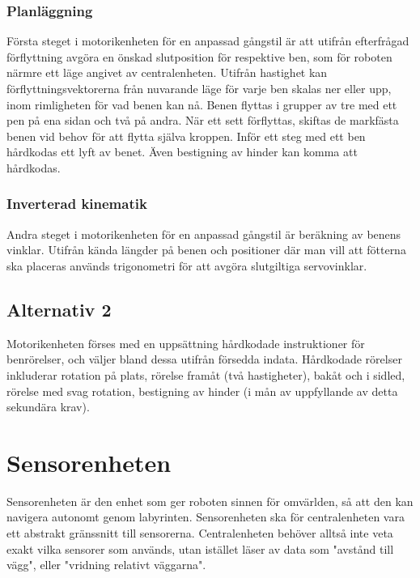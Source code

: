 \documentclass[a4paper,titlepage,12pt]{article}
\begin{document}
		\subsubsection{Planläggning}
	Första steget i motorikenheten för en anpassad gångstil är att utifrån efterfrågad
	förflyttning avgöra en önskad slutposition för respektive ben, som för roboten närmre 
	ett läge angivet av centralenheten. Utifrån hastighet kan förflyttningsvektorerna 
	från nuvarande läge för varje ben skalas ner eller upp, inom rimligheten för vad
	benen kan nå. Benen flyttas i grupper av tre med ett pen på ena sidan och två på  andra.
	När ett sett förflyttas, skiftas de markfästa benen vid behov för 
	att flytta själva kroppen. Inför ett steg med ett ben hårdkodas ett lyft av benet. 
	Även bestigning av hinder kan komma att hårdkodas.
	
	\subsubsection{Inverterad kinematik}
	Andra steget i motorikenheten för en anpassad gångstil är beräkning av
    benens vinklar. Utifrån kända längder på benen och positioner där man vill
    att fötterna ska placeras används trigonometri för att avgöra slutgiltiga
    servovinklar.

	\subsection{Alternativ 2}
	Motorikenheten förses med en uppsättning hårdkodade instruktioner för benrörelser, och
	väljer bland dessa utifrån försedda indata. Hårdkodade rörelser inkluderar rotation på 
	plats, rörelse framåt (två hastigheter), bakåt och i sidled, rörelse med svag rotation, 
	bestigning av hinder (i mån av uppfyllande av detta sekundära krav). 
	
	\section{Sensorenheten}
	
	Sensorenheten är den enhet som ger roboten sinnen för omvärlden, så att den
	kan navigera autonomt genom labyrinten. Sensorenheten ska för
	centralenheten vara ett abstrakt gränssnitt till sensorerna. Centralenheten
	behöver alltså inte veta exakt vilka sensorer som används, utan istället
	läser av data som "avstånd till vägg", eller "vridning relativt väggarna".
\end{document}
